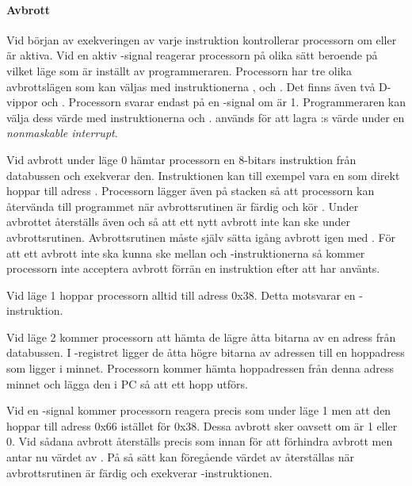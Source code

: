 \documentclass[main.tex]{subfiles}
\begin{document}
\paragraph{Avbrott}
Vid början av exekveringen av varje instruktion kontrollerar processorn om
 eller  är aktiva. Vid en aktiv -signal reagerar
processorn på olika sätt beroende på vilket läge som är inställt av
programmeraren. Processorn har tre olika avbrottslägen som kan väljas med
instruktionerna ,  och . Det finns även två
D-vippor  och . Processorn svarar endast på en
-signal om  är 1. Programmeraren kan välja dess värde med
instruktionerna  och .  används för att lagra
:s värde under en {\it nonmaskable interrupt}.

Vid avbrott under läge 0 hämtar processorn en 8-bitars instruktion från
databussen och exekverar den. Instruktionen kan till exempel vara en  som direkt hoppar till adress . Processorn lägger även
 på stacken så att processorn kan återvända till programmet när
avbrottsrutinen är färdig och kör . Under avbrottet återställs även
 och  så att ett nytt avbrott inte kan ske under
avbrottsrutinen.  Avbrottsrutinen måste själv sätta igång avbrott igen med
. För att ett avbrott inte ska kunna ske mellan  och
-instruktionerna så kommer processorn inte acceptera avbrott förrän
en instruktion efter att  har använts.

Vid läge 1 hoppar processorn alltid till adress 0x38. Detta motsvarar en
-instruktion.

Vid läge 2 kommer processorn att hämta de lägre åtta bitarna av en adress från
databussen. I -registret ligger de åtta högre bitarna av adressen till
en hoppadress som ligger i minnet. Processorn kommer hämta hoppadressen från
denna adress minnet och lägga den i PC så att ett hopp utförs.

Vid en -signal kommer processorn reagera precis som under läge 1 men
att den hoppar till adress 0x66 istället för 0x38. Dessa avbrott sker oavsett
om  är 1 eller 0. Vid sådana avbrott återställs  precis
som innan för att förhindra avbrott men  antar nu värdet av
. På så sätt kan föregående värdet av  återställas när
avbrottsrutinen är färdig och exekverar -instruktionen.
\end{document}
